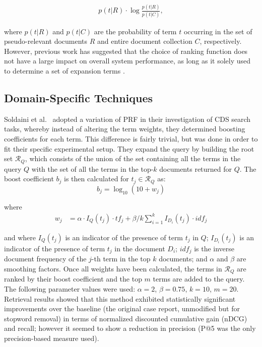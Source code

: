 \documentclass[a4paper]{report}
\begin{document}
\begin{equation}
\label{kld-feedback}
\begin{split}
p(t|R) \cdot \log{\frac{p(t|R)}{p(t|C)}},
\end{split}
\end{equation}

where $p(t|R)$ and $p(t|C)$ are the probability of term $t$ occurring in the set of pseudo-relevant documents $R$ and entire document collection $C$, respectively. However, previous work has suggested that the choice of ranking function does not have a large impact on overall system performance, as long as it solely used to determine a set of expansion terms \cite{Carpineto:2001:IAA:366836.366860}.


\subsection{Domain-Specific Techniques}

Soldaini et al.~\cite{Soldaini2015RetrievingML} adopted a variation of PRF in their investigation of CDS search tasks, whereby instead of altering the term weights, they determined boosting coefficients for each term. This difference is fairly trivial, but was done in order to fit their specific experimental setup. They expand the query by building the root set $\mathcal{R}_Q$, which consists of the union of the set containing all the terms in the query $Q$ with the set of all the terms in the top-$k$ documents returned for $Q$. The boost coefficient $b_j$ is then calculated for $t_j \in \mathcal{R}_Q$ as: $$b_j = \log_{10}(10+w_j)$$

where 
\begin{equation}
\label{prfscore}
\begin{split}
  w_j &= \alpha \cdot I_Q(t_j) \cdot tf_j + \beta/k \sum^{k}_{i=1} I_{D_i}(t_j)\cdot idf_j
\end{split}
\end{equation}

and where $I_Q(t_j)$ is an indicator of the presence of term $t_j$ in $Q$; $I_{D_i}(t_j)$ is an indicator of the presence of term $t_j$ in the document $D_i$; $idf_j$ is the inverse document frequency of the $j$-th term in the top $k$ documents; and $\alpha$ and $\beta$ are smoothing factors. Once all weights have been calculated, the terms in $\mathcal{R}_Q$ are ranked by their boost coefficient and the top $m$ terms are added to the query. The following parameter values were used: $\alpha = 2$, $\beta = 0.75$, $k = 10$, $m = 20$. Retrieval results showed that this method exhibited statistically significant improvements over the baseline (the original case report, unmodified but for stopword removal) in terms of normalized discounted cumulative gain (nDCG) and recall; however it seemed to show a reduction in precision (P@5 was the only precision-based measure used).
\end{document}
